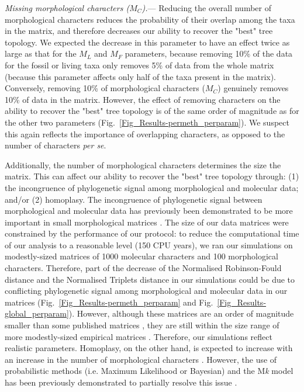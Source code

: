 \documentclass[12pt,letterpaper]{article}
\renewcommand{\subsubsection}[1]{%
\vspace{2ex}
\noindent
\textit{#1.}---}
\begin{document}
\subsubsection{Missing morphological characters ($M_{C}$)}
Reducing the overall number of morphological characters reduces the probability of their overlap among the taxa in the matrix, and therefore decreases our ability to recover the "best" tree topology. We expected the decrease in this parameter to have an effect twice as large as that for the $M_{L}$ and $M_{F}$ parameters, because removing 10\% of the data for the fossil or living taxa only removes 5\% of data from the whole matrix (because this parameter affects only half of the taxa present in the matrix). Conversely, removing 10\% of morphological characters ($M_{C}$) genuinely removes 10\% of data in the matrix. However, the effect of removing characters on the ability to recover the "best" tree topology is of the same order of magnitude as for the other two parameters (Fig.~\ref{Fig_Results-permeth_perparam}). We suspect this again reflects the importance of overlapping characters, as opposed to the number of characters \textit{per se}.

Additionally, the number of morphological characters determines the size the matrix. This can affect our ability to recover the "best" tree topology through: (1) the incongruence of phylogenetic signal among morphological and molecular data; and/or (2) homoplasy. The incongruence of phylogenetic signal between morphological and molecular data has previously been demonstrated to be more important in small morphological matrices \citep{wagner2000}. The size of our data matrices were constrained by the performance of our protocol: to reduce the computational time of our analysis to a reasonable level (150 CPU years), we ran our simulations on modestly-sized matrices of 1000 molecular characters and 100 morphological characters. Therefore, part of the decrease of the Normalised Robinson-Fould distance and the Normalised Triplets distance in our simulations could be due to conflicting phylogenetic signal among morphological and molecular data in our matrices (Fig.~\ref{Fig_Results-permeth_perparam} and Fig.~\ref{Fig_Results-global_perparam}). However, although these matrices are an order of magnitude smaller than some published matrices \citep[e.g.][]{springermacroevolutionary2012,nithe2013}, they are still within the size range of more modestly-sized empirical matrices \citep[e.g.][]{kellymolecular2014, sallam2011craniodental}. Therefore, our simulations reflect realistic parameters. Homoplasy, on the other hand, is expected to increase with an increase in the number of morphological characters \citep{wrightbayesian2014}. However, the use of probabilistic methods (i.e. Maximum Likelihood or Bayesian) and the M\textit{k} model \citep{lewisa2001} has been previously demonstrated to partially resolve this issue \citep{wrightbayesian2014}.
\end{document}
